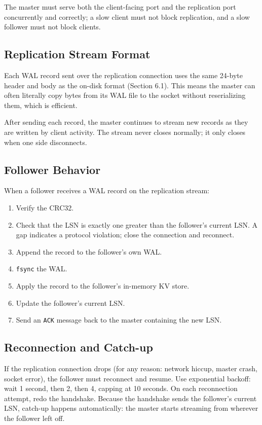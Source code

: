 \documentclass[11pt,a4paper]{article}
\begin{document}
The master must serve both the client-facing port and the replication port concurrently and correctly; a slow client must not block replication, and a slow follower must not block clients.

\subsection{Replication Stream Format}
Each WAL record sent over the replication connection uses the same 24-byte header and body as the on-disk format (Section 6.1). This means the master can often literally copy bytes from its WAL file to the socket without reserializing them, which is efficient.

After sending each record, the master continues to stream new records as they are written by client activity. The stream never closes normally; it only closes when one side disconnects.

\subsection{Follower Behavior}
When a follower receives a WAL record on the replication stream:

\begin{enumerate}
\item Verify the CRC32.
\item Check that the LSN is exactly one greater than the follower's current LSN. A gap indicates a protocol violation; close the connection and reconnect.
\item Append the record to the follower's own WAL.
\item \texttt{fsync} the WAL.
\item Apply the record to the follower's in-memory KV store.
\item Update the follower's current LSN.
\item Send an \texttt{ACK} message back to the master containing the new LSN.
\end{enumerate}

\subsection{Reconnection and Catch-up}
If the replication connection drops (for any reason: network hiccup, master crash, socket error), the follower must reconnect and resume. Use exponential backoff: wait 1 second, then 2, then 4, capping at 10 seconds. On each reconnection attempt, redo the handshake. Because the handshake sends the follower's current LSN, catch-up happens automatically: the master starts streaming from wherever the follower left off.
\end{document}
